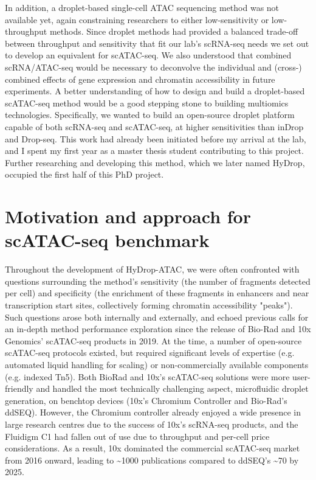 In addition, a droplet-based single-cell ATAC sequencing method was not available yet, again constraining researchers to either low-sensitivity or low-throughput methods. Since droplet methods had provided a balanced trade-off between throughput and sensitivity that fit our lab's scRNA-seq needs we set out to develop an equivalent for scATAC-seq. We also understood that combined scRNA/ATAC-seq would be necessary to deconvolve the individual and (cross-) combined effects of gene expression and chromatin accessibility in future experiments. A better understanding of how to design and build a droplet-based scATAC-seq method would be a good stepping stone to building multiomics technologies. Specifically, we wanted to build an open-source droplet platform capable of both scRNA-seq and scATAC-seq, at higher sensitivities than inDrop and Drop-seq. This work had already been initiated before my arrival at the lab, and I spent my first year as a master thesis student contributing to this project. Further researching and developing this method, which we later named HyDrop, occupied the first half of this PhD project.

\section{Motivation and approach for scATAC-seq benchmark}
Throughout the development of HyDrop-ATAC, we were often confronted with questions surrounding the method's sensitivity (the number of fragments detected per cell) and specificity (the enrichment of these fragments in enhancers and near transcription start sites, collectively forming chromatin accessibility "peaks"). Such questions arose both internally and externally, and echoed previous calls for an in-depth method performance exploration since the release of Bio-Rad and 10x Genomics' scATAC-seq products in 2019. At the time, a number of open-source scATAC-seq protocols existed, but required significant levels of expertise (e.g. automated liquid handling for scaling) or non-commercially available components (e.g. indexed Tn5). Both BioRad and 10x's scATAC-seq solutions were more user-friendly and handled the most technically challenging aspect, microfluidic droplet generation, on benchtop devices (10x's Chromium Controller and Bio-Rad's ddSEQ). However, the Chromium controller already enjoyed a wide presence in large research centres due to the success of 10x's scRNA-seq products, and the Fluidigm C1 had fallen out of use due to throughput and per-cell price considerations. As a result, 10x dominated the commercial scATAC-seq market from 2016 onward, leading to \textasciitilde{1000} publications compared to ddSEQ's \textasciitilde{70} by 2025.

